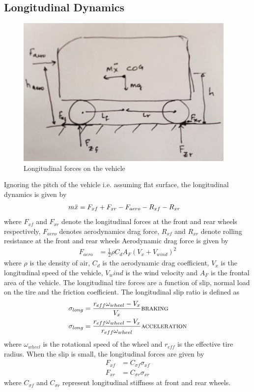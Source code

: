 \subsection{Longitudinal Dynamics}
\begin{figure}
    \centering
    \includegraphics{veh_long_dyn.jpg}
    \caption{Longitudinal forces on the vehicle}
    \label{fig:veh_long_dyn}
\end{figure}
Ignoring the pitch of the vehicle i.e. assuming flat surface, the longitudinal dynamics is given by
\begin{align}
    m\Ddot{x}&=F_{xf} + F_{xr} - F_{aero} - R_{xf} - R_{xr}
\end{align}
where $F_{xf}$ and $F_{xr}$ denote the longitudinal forces at the front and rear wheels respectively, $F_{aero}$ denotes aerodynamics drag force, $R_{xf}$ and $R_{xr}$ denote rolling resistance at the front and rear wheels
Aerodynamic drag force is given by
\begin{align}
    F_{aero} &= \frac{1}{2}\rho C_dA_F(V_x+V_{wind})^2
\end{align}
where $\rho$ is the density of air, $C_d$ is the aerodynamic drag coefficient, $V_x$ is the longitudinal speed of the vehicle, $V_wind$ is the wind velocity and $A_F$ is the frontal area of the vehicle.
The longitudinal tire forces are a function of slip, normal load on the tire and the friction coefficient.
The longitudinal slip ratio is defined as
\begin{align}
    \sigma_{long} &= \frac{r_{eff}\omega_{wheel}-V_x}{V_x} \textsc{braking} \\
    \sigma_{long} &= \frac{r_{eff}\omega_{wheel}-V_x}{r_{eff}\omega_{wheel}} \textsc{acceleration} 
\end{align}
where $\omega_{wheel}$ is the rotational speed of the wheel and $r_{eff}$ is the effective tire radius.
When the slip is small, the longitudinal forces are given by
\begin{align*}
    F_{xf} &= C_{\sigma f}\sigma_{xf} \\
    F_{xr} &= C_{\sigma r}\sigma_{xr}
\end{align*}
where $C_{\sigma f}$ and $C_{\sigma r}$ represent longitudinal stiffness at front and rear wheels.

